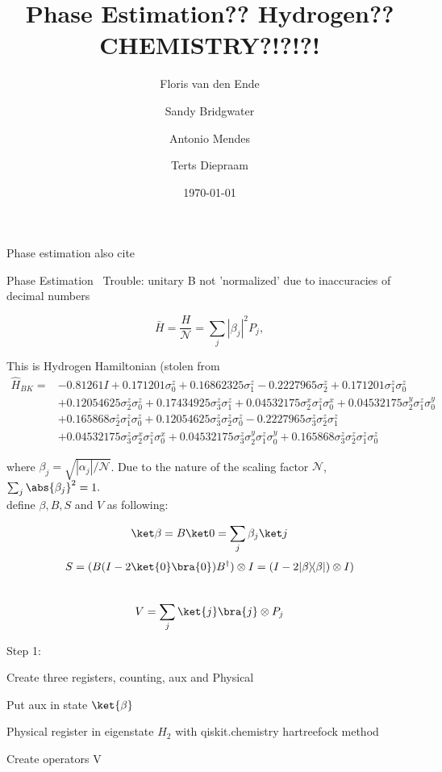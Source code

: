 \documentclass{article}
\title{Phase Estimation?? Hydrogen?? CHEMISTRY?!?!?!}
\author{Floris van den Ende\and Sandy Bridgwater\and Antonio Mendes\and Terts Diepraam}
\date{\today}
\def\kb#1#2{| #1 \rangle\!\langle #2 |}
\begin{document}
\maketitle

Phase estimation also cite \cite{nielsen}

Phase Estimation~\cite{Qiskit-Textbook}
Trouble: unitary B not 'normalized' due to inaccuracies of decimal numbers

\begin{equation}
	\bar H = \frac H{\mathcal{N}} = \sum_j|\beta_j|^2 P_j,
\end{equation}

This is Hydrogen Hamiltonian (stolen from \cite{seeley}
$$
\begin{aligned}
\hat{H}_{B K}=&-0.81261 I+0.171201 \sigma_{0}^{z}+0.16862325 \sigma_{1}^{z}-0.2227965 \sigma_{2}^{z}+0.171201 \sigma_{1}^{z} \sigma_{0}^{z} \\
&+0.12054625 \sigma_{2}^{z} \sigma_{0}^{z}+0.17434925 \sigma_{3}^{z} \sigma_{1}^{z}+0.04532175 \sigma_{2}^{x} \sigma_{1}^{z} \sigma_{0}^{x}+0.04532175 \sigma_{2}^{y} \sigma_{1}^{z} \sigma_{0}^{y} \\
&+0.165868 \sigma_{2}^{z} \sigma_{1}^{z} \sigma_{0}^{z}+0.12054625 \sigma_{3}^{z} \sigma_{2}^{z} \sigma_{0}^{z}-0.2227965 \sigma_{3}^{z} \sigma_{2}^{z} \sigma_{1}^{z} \\
&+0.04532175 \sigma_{3}^{z} \sigma_{2}^{x} \sigma_{1}^{z} \sigma_{0}^{x}+0.04532175 \sigma_{3}^{z} \sigma_{2}^{y} \sigma_{1}^{z} \sigma_{0}^{y}+0.165868 \sigma_{3}^{z} \sigma_{2}^{z} \sigma_{1}^{z} \sigma_{0}^{z}
\end{aligned}
$$

where $\beta_j = \sqrt{|\alpha_j|/\mathcal{N}}$. Due to the nature of the scaling factor $\mathcal{N}$, $\sum_j \abs{\beta_j}^2 = 1.$
\\\textcite{poulin} define $\beta, B, S$ and  $V$ as following:

$$
\ket\beta = B\ket 0 = \sum_j \beta_j \ket j$$
$$
S = (B (I - 2 \ket{0}\bra{0}) B^{\dagger}) \otimes I= (I-2\kb \beta \beta) \otimes I)$$
\\
$$
V=\sum_{j}\ket{j}\bra{j} \otimes P_{j}
$$

Step 1:

Create three registers, counting, aux and Physical

Put aux in state $\ket{\beta}$

Physical register in eigenstate $H_2$ with qiskit.chemistry hartreefock method

Create operators V

\printbibliography
\end{document}
